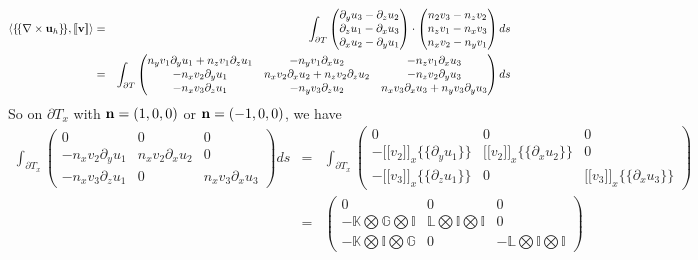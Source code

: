\documentclass[final,leqno]{siamltex704}
\newcommand{\bn}{{\bf n}}
\newcommand{\bv}{{\bf v}}
\def\bn{{\bf n}}
\def\bu{{\bf u}}
\def\bv{{\bf v}}
\def\ljump{{[\![}}
\def\rjump{{]\!]}}
\def\lavg{{\{\!\{}}
\def\ravg{{\}\!\}}}
\begin{document}
\begin{eqnarray*}
\langle\lavg\nabla\times\bu_h\ravg,\ljump\bv\rjump \rangle &=& \int_{\partial T}
	\begin{pmatrix}
	\partial_y u_3-\partial_zu_2\\ \partial_zu_1-\partial_xu_3\\ \partial_xu_2-\partial_yu_1
	\end{pmatrix}\cdot
	\begin{pmatrix}
	n_2 v_3-n_z v_2\\ n_z v_1-n_x v_3\\ n_x v_2-n_yv_1
	\end{pmatrix}ds\\
	&=&\int_{\partial T}
	\begin{pmatrix}
	n_y v_1\partial_y u_1+n_z v_1\partial_z u_1 & -n_y v_1\partial_x u_2 & -n_zv_1\partial_xu_3\\
	-n_xv_2\partial_yu_1 & n_xv_2\partial_xu_2+n_zv_2\partial_zu_2 &-n_zv_2\partial_yu_3\\
	-n_xv_3\partial_zu_1 & -n_yv_3\partial_zu_2 & n_xv_3\partial_xu_3+n_yv_3\partial_yu_3
	\end{pmatrix}ds
\end{eqnarray*}
So on $\partial T_x$ with $\bn=(1,0,0)$ or $\bn=(-1,0,0)$, we have
\begin{eqnarray*}
\int_{\partial T_x}
	\begin{pmatrix}
	0 & 0 & 0\\
	-n_xv_2\partial_yu_1 & n_xv_2\partial_xu_2 &0\\
	-n_xv_3\partial_zu_1 & 0 & n_xv_3\partial_xu_3
	\end{pmatrix}ds
	&=&
\int_{\partial T_x}
	\begin{pmatrix}
	0 & 0 & 0\\
	-\ljump v_2\rjump_x\lavg\partial_yu_1\ravg & \ljump v_2\rjump_x\lavg\partial_xu_2\ravg &0\\
	-\ljump v_3\rjump_x\lavg\partial_zu_1\ravg & 0 & \ljump v_3\rjump_x\lavg\partial_xu_3\ravg
	\end{pmatrix}	\\
	&=&
	\begin{pmatrix}
	0 & 0 & 0\\
	-\mathbb{K}\bigotimes\mathbb{G}\bigotimes\mathbb{I}&\mathbb{L}\bigotimes\mathbb{I}\bigotimes\mathbb{I} &0\\
	-\mathbb{K}\bigotimes\mathbb{I}\bigotimes\mathbb{G} &0   & -\mathbb{L}\bigotimes\mathbb{I}\bigotimes\mathbb{I}
	\end{pmatrix}	
\end{eqnarray*}
\end{document}
